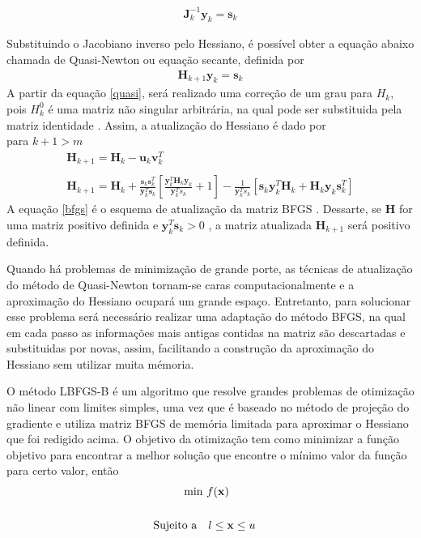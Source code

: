 \begin{eqnarray}
 \nonumber
       \mathbf{J}_{k}^{-1}  \mathbf{y}_{k} =  \mathbf{s}_{k}
\end{eqnarray}


Substituindo o Jacobiano inverso pelo Hessiano, é possível obter a equação abaixo chamada de Quasi-Newton ou equação secante, definida por
\begin{eqnarray}
 \mathbf{H}_{k+1}  \mathbf{y}_{k} =  \mathbf{s}_{k}
 \label{quasi}
\end{eqnarray}
A partir da equação \ref{quasi}, será realizado uma correção de um grau para $H_{k}$, pois $H_{k}^{0}$ é uma matriz não singular arbitrária, na qual pode ser substituida pela matriz identidade \citep{al-baali_broydens_2013}. Assim, a atualização do Hessiano é dado por \\

 para $k + 1 > m$ 
\begin{eqnarray}
\nonumber
      \mathbf{H}_{k+1} =  \mathbf{H}_{k} -  \mathbf{u}_{k}  \mathbf{v}_{k}^{T}~~~~~~ ~~~~~~~ ~~~ ~~ ~ ~~~ ~~~~  \\ \nonumber \\
       \mathbf{H}_{k+1}= \mathbf{H}_{k}+\frac{ \mathbf{s}_{k}  \mathbf{s}_{k}^{T}}{ \mathbf{y}_{k}^{T}  \mathbf{s}_{k}}\left[\frac{ \mathbf{y}_{k}^{T}  \mathbf{H}_{k}  \mathbf{y}_{k}}{ \mathbf{y}_{k}^{T}s_{k}}+1\right]-\frac{1}{ \mathbf{y}_{k}^{T}s_{k}}\left[ \mathbf{s}_{k}  \mathbf{y}_{k}^{T}  \mathbf{H}_{k}+ \mathbf{H}_{k}  \mathbf{y}_{k}  \mathbf{s}_{k}^{T}\right] 
 \label{bfgs}
\end{eqnarray}
A equação \ref{bfgs} é o esquema de atualização da matriz BFGS \citep{nocedal_1980} . Dessarte, se $\mathbf{H}$ for uma matriz positivo definida e $\mathbf{y}_{k}^{T} \mathbf{s}_{k} > 0$ , a matriz atualizada $\mathbf{H}_{k+1}$ será positivo definida.  

Quando há problemas de minimização de grande porte, as técnicas de atualização do método de Quasi-Newton tornam-se caras computacionalmente e a aproximação do Hessiano ocupará um grande espaço. Entretanto, para solucionar esse problema será necessário realizar uma adaptação do método BFGS, na qual em cada passo as informações mais antigas contidas na matriz são descartadas e substituidas por novas, assim, facilitando a construção da aproximação do Hessiano sem utilizar muita mémoria.

O método LBFGS-B é um algoritmo que resolve grandes problemas de otimização não linear com limites simples, uma vez que é baseado no método de projeção do gradiente e utiliza matriz BFGS de memória limitada para aproximar o Hessiano que foi redigido acima. O objetivo da otimização tem como minimizar a função objetivo para encontrar a melhor solução que encontre o mínimo valor da função para certo valor, então
\begin{eqnarray}
\nonumber
  \hbox{min}~f(\mathbf{x})~~~~~~~~~~ \\
\nonumber \\
\nonumber
   \hbox{Sujeito}~\hbox{a}~~~l\le\mathbf{x}\le u ~~~
\end{eqnarray}

